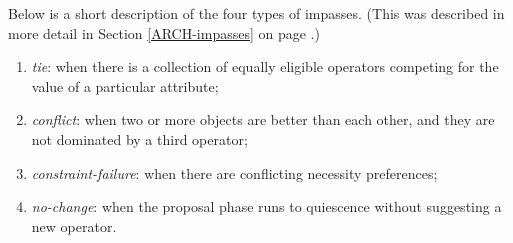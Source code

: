 Below is a short description of the four types of impasses. (This was
described in more detail in Section \ref{ARCH-impasses} on page
\pageref{ARCH-impasses}.)\vspace{-12pt}
\begin{enumerate}
\item \emph{tie}: when there is a collection of equally eligible operators
        competing for the value of a particular attribute;\vspace{-8pt}
\item \emph{conflict}: when two or more objects are better than each other,
        and they are not dominated by a third operator;\vspace{-8pt}
\item \emph{constraint-failure}: when there are conflicting necessity
        preferences; \vspace{-8pt}
\item \emph{no-change}: when the proposal phase runs to quiescence without 
        suggesting a new operator.
\end{enumerate}

